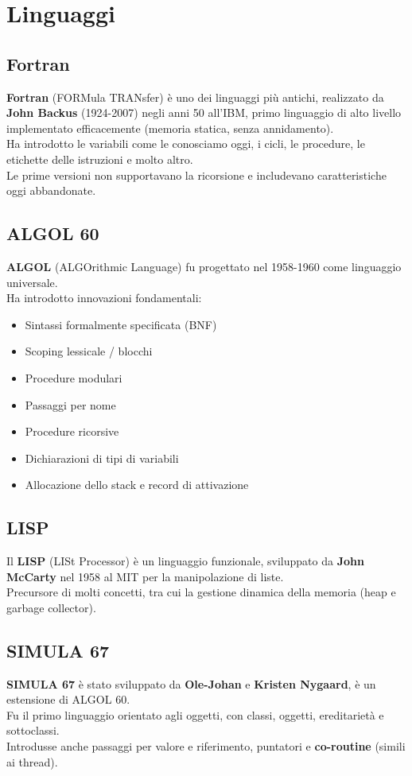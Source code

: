 \documentclass[12pt,a4paper]{article}
\let\oldsection\section
\renewcommand{\section}{\clearpage\oldsection}
\begin{document}
\section{Linguaggi}
\subsection{Fortran}
\textbf{Fortran} (FORMula TRANsfer) è uno dei linguaggi più antichi, realizzato da \textbf{John Backus} (1924-2007) negli anni 50 all'IBM, primo linguaggio di alto livello implementato efficacemente (memoria statica, senza annidamento).\\
Ha introdotto le variabili come le conosciamo oggi, i cicli, le procedure, le etichette delle istruzioni e molto altro.\\
Le prime versioni non supportavano la ricorsione e includevano caratteristiche oggi abbandonate.
\subsection{ALGOL 60}
\textbf{ALGOL} (ALGOrithmic Language) fu progettato nel 1958-1960 come linguaggio universale.\\
Ha introdotto innovazioni fondamentali:
\begin{itemize}
  \item Sintassi formalmente specificata (BNF)
  \item Scoping lessicale / blocchi
  \item Procedure modulari
  \item Passaggi per nome
  \item Procedure ricorsive
  \item Dichiarazioni di tipi di variabili
  \item Allocazione dello stack e record di attivazione
\end{itemize}
\subsection{LISP}
Il \textbf{LISP} (LISt Processor) è un linguaggio funzionale, sviluppato da \textbf{John McCarty} nel 1958 al MIT per la manipolazione di liste.\\
Precursore di molti concetti, tra cui la gestione dinamica della memoria (heap e garbage collector).

\subsection{SIMULA 67}
\textbf{SIMULA 67} è stato sviluppato da \textbf{Ole-Johan} e \textbf{Kristen Nygaard}, è un estensione di ALGOL 60.\\
Fu il primo linguaggio orientato agli oggetti, con classi, oggetti, ereditarietà e sottoclassi.\\
Introdusse anche passaggi per valore e riferimento, puntatori e \textbf{co-routine} (simili ai thread).
\end{document}

